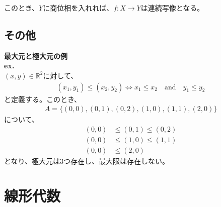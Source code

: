 \documentclass[a4paper,11pt]{jsarticle}
\numberwithin{equation}{section}
\begin{document}
このとき、$Y$に商位相を入れれば、$f:X \to Y$は連続写像となる。\\

\subsection{その他}
\textbf{最大元と極大元の例}\\
\textbf{ex.}\\
\((x,y) \in \mathbb{R}^2\)に対して、
\begin{align}
  (x_1,y_1) \leq (x_2,y_2) \Leftrightarrow x_1 \leq x_2 \quad\text{and} \quad y_1 \leq y_2
\end{align}
と定義する。このとき、
\begin{align}
A = \{(0,0),(0,1),(0,2),(1,0),(1,1),(2,0)\}
\end{align}
について、
\begin{align}
  (0,0) &\leq (0,1) \leq (0,2)\\
  (0,0) &\leq (1,0) \leq (1,1)\\
  (0,0) &\leq (2,0)  
\end{align}
となり、極大元は3つ存在し、最大限は存在しない。\\


\section{線形代数}
\end{document}
